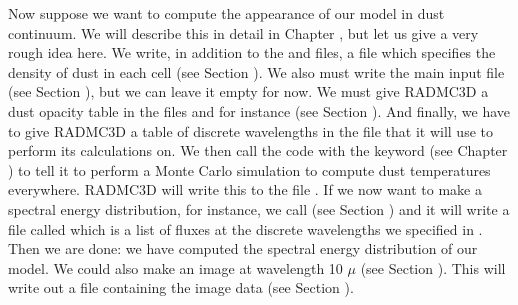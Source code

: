 \documentclass[letterpaper,10pt,english]{sphinxmanual}
\begin{document}
Now suppose we want to compute the appearance of our model in dust continuum. We
will describe this in detail in Chapter {\hyperref[\detokenize{dustradtrans:chap-dust-transfer}]{}}, but let us
give a very rough idea here. We write, in addition to the  and
 files, a file  which specifies the density of
dust in each cell (see Section {\hyperref[\detokenize{inputoutputfiles:sec-dustdens}]{}}).  We also must write the
main input file  (see Section {\hyperref[\detokenize{inputoutputfiles:sec-radmc-inp}]{}}), but we can
leave it empty for now. We must give RADMC\sphinxhyphen{}3D a dust opacity table in the files
 and for instance  (see Section
{\hyperref[\detokenize{inputoutputfiles:sec-opacities}]{}}). And finally, we have to give RADMC\sphinxhyphen{}3D a table of discrete
wavelengths in the file  that it will use to perform
its calculations on. We then call the  code with the keyword
 (see Chapter {\hyperref[\detokenize{dustradtrans:chap-dust-transfer}]{}}) to tell it to perform a
Monte Carlo simulation to compute dust temperatures everywhere. RADMC\sphinxhyphen{}3D will
write this to the file . If we now want to make a
spectral energy distribution, for instance, we call  (see Section
{\hyperref[\detokenize{imagesspectra:sec-making-spectra}]{}}) and it will write a file called 
which is a list of fluxes at the discrete wavelengths we specified in
.  Then we are done: we have computed the spectral
energy distribution of our model. We could also make an image at wavelength 10
\(\mu\) (see Section
{\hyperref[\detokenize{imagesspectra:sec-images}]{}}). This will write out a file  containing the
image data (see Section {\hyperref[\detokenize{inputoutputfiles:sec-image-out}]{}}).
\end{document}
